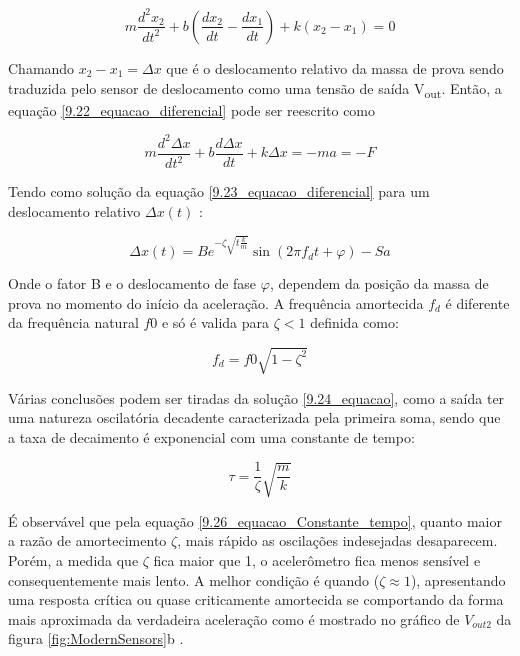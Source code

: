 \begin{equation}
    m\frac{d^2x_2}{dt^2}+b(\frac{dx_2}{dt}-\frac{dx_1}{dt})+k(x_2-x_1)=0
    \label{9.22_equacao_diferencial}
\end{equation} 


Chamando $ x_2 - x_1 = \Delta x $ que é o deslocamento relativo da massa de prova sendo traduzida pelo sensor de deslocamento como uma tensão de saída V\textsubscript{out}. Então, a equação \ref{9.22_equacao_diferencial} pode ser reescrito como

  \begin{equation}
    m\frac{d^2\Delta x}{dt^2}+b\frac{d\Delta x}{dt}+k\Delta x=-ma=-F
    \label{9.23_equacao_diferencial}
\end{equation} 


Tendo como solução da equação \ref{9.23_equacao_diferencial} para um deslocamento relativo $\Delta x(t)$ :


\begin{equation}
    \Delta x(t) = Be^{-\zeta\sqrt{t\frac{k}{m}}}\sin{(2\pi f_dt+\varphi )}  - Sa 
    \label{9.24_equacao}
\end{equation} 





Onde o fator B e o deslocamento de fase $\varphi$, dependem da posição da massa de prova no
momento do início da aceleração.
A frequência amortecida $f_d$ é diferente da frequência natural $f0$ e só é valida para $\zeta<1$ definida como:


\begin{equation}
    f_d = f0\sqrt{1-\zeta^2} 
    \label{9.25_equacao}
\end{equation} 


Várias conclusões podem ser tiradas da solução \ref{9.24_equacao}, como a saída ter uma
natureza oscilatória decadente caracterizada pela primeira soma, sendo que a taxa de decaimento é exponencial com uma constante de tempo:


\begin{equation}
    \tau = \frac{1}{\zeta}\sqrt{\frac{m}{k}}
    \label{9.26_equacao_Constante_tempo}
\end{equation} 


É observável que pela equação \ref{9.26_equacao_Constante_tempo}, quanto maior a razão de amortecimento $\zeta$, mais rápido as oscilações indesejadas desaparecem. Porém, a medida que $\zeta$  fica maior que 1, o acelerômetro fica menos sensível e consequentemente mais lento. A melhor condição é quando ($\zeta \approx 1$), apresentando uma resposta crítica ou quase criticamente amortecida se comportando da forma mais aproximada da verdadeira aceleração como é mostrado no gráfico de $V_{out2}$ da figura \ref{fig:ModernSensors}b \cite{ModernSensors}. 


